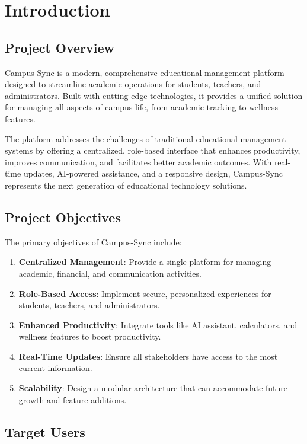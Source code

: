 \chapter{Introduction}

\section{Project Overview}

Campus-Sync is a modern, comprehensive educational management platform designed to streamline academic operations for students, teachers, and administrators. Built with cutting-edge technologies, it provides a unified solution for managing all aspects of campus life, from academic tracking to wellness features.

The platform addresses the challenges of traditional educational management systems by offering a centralized, role-based interface that enhances productivity, improves communication, and facilitates better academic outcomes. With real-time updates, AI-powered assistance, and a responsive design, Campus-Sync represents the next generation of educational technology solutions.

\section{Project Objectives}

The primary objectives of Campus-Sync include:

\begin{enumerate}[label=\textbf{\arabic*.}]
    \item \textbf{Centralized Management}: Provide a single platform for managing academic, financial, and communication activities.
    \item \textbf{Role-Based Access}: Implement secure, personalized experiences for students, teachers, and administrators.
    \item \textbf{Enhanced Productivity}: Integrate tools like AI assistant, calculators, and wellness features to boost productivity.
    \item \textbf{Real-Time Updates}: Ensure all stakeholders have access to the most current information.
    \item \textbf{Scalability}: Design a modular architecture that can accommodate future growth and feature additions.
\end{enumerate}

\section{Target Users}

